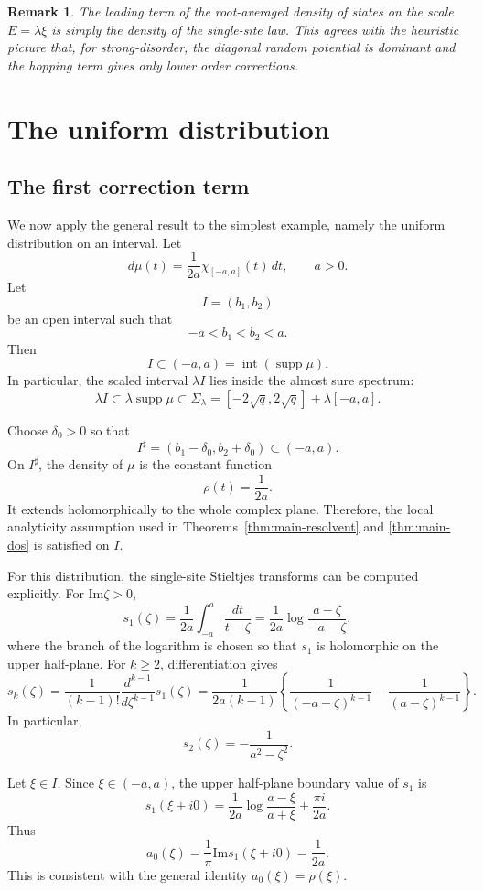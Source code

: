 \documentclass[a4paper,11pt]{article}
\newtheorem{rem}[thm]{Remark}
\newcommand{\Impart}{\mathrm{Im}}
\begin{document}
\begin{rem}
The leading term of the root-averaged density of states on the scale
$E=\lambda\xi$ is simply the density of the single-site law.
This agrees with the heuristic picture that, for strong-disorder, the diagonal random
potential is dominant and the hopping term gives only lower order corrections.
\end{rem}

\section{The uniform distribution}
\label{sec:uniform-distribution}

\subsection{The first correction term}

We now apply the general result to the simplest example, namely the uniform distribution on an interval. 
Let
$$
d\mu(t)=\frac{1}{2a}\chi_{[-a,a]}(t)\,dt,
\qquad
a>0.
$$
Let
$$
I=(b_1,b_2)
$$
be an open interval such that
$$
-a<b_1<b_2<a.
$$
Then
$$
I\subset (-a,a)=\operatorname{int}(\operatorname{supp}\mu).
$$
In particular, the scaled interval $\lambda I$ lies inside the almost sure spectrum:
$$
\lambda I\subset
\lambda\operatorname{supp}\mu
\subset\Sigma_\lambda = [-2\sqrt q,2\sqrt q]+\lambda[-a,a].
$$

Choose $\delta_0>0$ so that
$$
I^\sharp=(b_1-\delta_0,b_2+\delta_0)\subset (-a,a).
$$
On $I^\sharp$, the density of $\mu$ is the constant function
$$
\rho(t)=\frac{1}{2a}.
$$
It extends holomorphically to the whole complex plane. 
Therefore, the local analyticity assumption used in Theorems~\ref{thm:main-resolvent}
and \ref{thm:main-dos} is satisfied on $I$.

For this distribution, the single-site Stieltjes transforms can be computed explicitly.
For $\Impart\zeta>0$,
$$
s_1(\zeta)=
\frac{1}{2a}\int_{-a}^{a}\frac{dt}{t-\zeta}
=
\frac{1}{2a}
\log\frac{a-\zeta}{-a-\zeta},
$$
where the branch of the logarithm is chosen so that $s_1$ is holomorphic
on the upper half-plane. 
For $k\ge2$, differentiation gives
$$
s_k(\zeta)
=
\frac{1}{(k-1)!}
\frac{d^{k-1}}{d\zeta^{k-1}}s_1(\zeta)
=
\frac{1}{2a(k-1)}
\left\{
\frac{1}{(-a-\zeta)^{k-1}}
-
\frac{1}{(a-\zeta)^{k-1}}
\right\}.
$$
In particular,
$$
s_2(\zeta)
=
-\frac{1}{a^2-\zeta^2}.
$$

Let $\xi\in I$. Since $\xi\in(-a,a)$, the upper half-plane boundary
value of $s_1$ is
$$
s_1(\xi+i0)
=
\frac{1}{2a}\log\frac{a-\xi}{a+\xi}
+
\frac{\pi i}{2a}.
$$
Thus
$$
a_0(\xi)
=
\frac{1}{\pi}\Impart s_1(\xi+i0)
=
\frac{1}{2a}.
$$
This is consistent with the general identity $a_0(\xi)=\rho(\xi)$.
\end{document}
